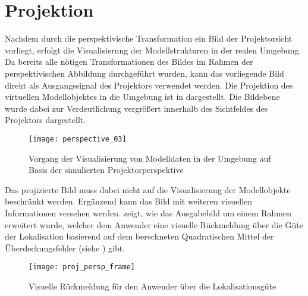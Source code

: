\section{Projektion}
\label{chap.projection}
Nachdem durch die perspektivische Transformation ein Bild der Projektorsicht vorliegt, erfolgt die Visualisierung der Modellstrukturen in der realen Umgebung. Da bereits alle nötigen Transformationen des Bildes im Rahmen der perspektivischen Abbildung durchgeführt wurden, kann das vorliegende Bild direkt als Ausgangssignal des Projektors verwendet werden. Die Projektion des virtuellen Modellobjektes in die Umgebung ist in  dargestellt. 
Die Bildebene wurde dabei zur Verdeutlichung vergrößert innerhalb des Sichtfeldes des Projektors dargestellt. 

\begin{figure}[!ht]
	\begin{center}
		\texttt{[image: perspective\_03]}
		\caption{Vorgang der Visualisierung von Modelldaten in der Umgebung auf Basis der simulierten Projektorperspektive}
		\label{fig.perspproj}
	\end{center}
\end{figure}

Das projizierte Bild muss dabei nicht auf die Visualisierung der Modellobjekte beschränkt werden. Ergänzend kann das Bild mit weiteren visuellen Informationen versehen werden.  zeigt, wie das Ausgabebild um einem Rahmen erweitert wurde, welcher dem Anwender eine visuelle Rückmeldung über die Güte der Lokalisation basierend auf dem berechneten Quadratischen Mittel der Überdeckungsfehler (siehe ) gibt.\\

\prever{
}

\begin{figure}[!ht]
	\begin{center}
		\texttt{[image: proj\_persp\_frame]}
		\caption{Visuelle Rückmeldung für den Anwender über die Lokalisationsgüte}
		\label{fig.proj_rms}
	\end{center}
\end{figure}

\prever{
}